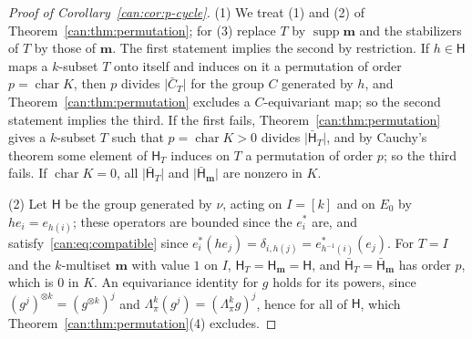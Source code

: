 \documentclass[11pt]{amsart}
\theoremstyle{definition}
\theoremstyle{remark}
\numberwithin{equation}{section}
\newcommand{\abs}[1]{\lvert #1\rvert}
\theoremstyle{plain}
\theoremstyle{definition}
\theoremstyle{plain}
\begin{document}
\begin{proof}[Proof of Corollary~\ref{can:cor:p-cycle}]
(1) We treat (1) and (2) of Theorem~\ref{can:thm:permutation}; for (3) replace $T$ by $\operatorname{supp}\mathbf m$ and
the stabilizers of $T$ by those of $\mathbf m$. The first statement implies the second by restriction. If $h\in\mathsf H$
maps a $k$\nobreakdash-subset $T$ onto itself and induces on it a permutation of order $p=\operatorname{char}K$, then $p$
divides $\abs{\bar C_T}$ for the group $C$ generated by $h$, and Theorem~\ref{can:thm:permutation} excludes a
$C$\nobreakdash-equivariant map; so the second statement implies the third. If the first fails,
Theorem~\ref{can:thm:permutation} gives a $k$\nobreakdash-subset $T$ such that $p=\operatorname{char}K>0$ divides
$\abs{\bar{\mathsf H}_T}$, and by Cauchy's theorem some element of $\mathsf H_T$ induces on $T$ a permutation of order
$p$; so the third fails. If $\operatorname{char}K=0$, all $\abs{\bar{\mathsf H}_T}$ and $\abs{\bar{\mathsf H}_{\mathbf m}}$
are nonzero in $K$.

(2) Let $\mathsf H$ be the group generated by $\nu$, acting on $I=[k]$ and on $E_0$ by $he_i=e_{h(i)}$; these operators
are bounded since the $e^*_i$ are, and satisfy~\eqref{can:eq:compatible} since
$e^*_i(he_j)=\delta_{i,h(j)}=e^*_{h^{-1}(i)}(e_j)$. For $T=I$ and the $k$\nobreakdash-multiset $\mathbf m$ with value $1$
on $I$, $\mathsf H_T=\mathsf H_{\mathbf m}=\mathsf H$, and $\bar{\mathsf H}_T=\bar{\mathsf H}_{\mathbf m}$ has order $p$,
which is $0$ in $K$. An equivariance identity for $g$ holds for its powers, since $(g^j)^{\otimes k}=(g^{\otimes k})^j$
and $\Lambda^k_\pi(g^j)=(\Lambda^k_\pi g)^j$, hence for all of $\mathsf H$, which Theorem~\ref{can:thm:permutation}(4)
excludes.
\end{proof}
\end{document}
